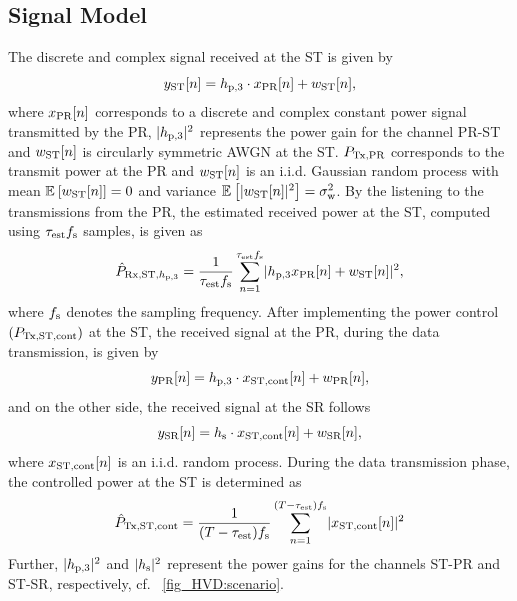 \subsection{Signal Model}
The discrete and complex signal received at the ST is given by
\begin{equation}
y_{\text{ST}}[n] = h_{\text{p,3}} \cdot x_{\text{PR}}[n] + w_{\text{ST}}[n],
\label{eq_HVD:sys_mod_st}
\end{equation}
where $x_{\text{PR}}[n]$ corresponds to a discrete and complex constant power signal transmitted by the PR, $|h_{\text{p,3}}|^2$ represents the power gain for the channel PR-ST and $w_{\text{ST}}[n]$ is circularly symmetric AWGN at the ST.
 $P_{\text{Tx,PR}}$  corresponds to the transmit power at the PR and $w_{\text{ST}}[n]$ is an i.i.d. Gaussian random process with mean ${\mathbb E}_{}\left[ w_{\text{ST}}[n] \right] = 0$ and variance ${\mathbb E}_{}\left[ |w_{\text{ST}}[n]|^2 \right] = \sigma^2_{\text{w}}$. By the listening to the transmissions from the PR, the estimated received power at the ST, computed using $\tau_{\text{est}} f_{\text{s}}$ samples, is given as
\begin{align}
\hat{P}_{\text{Rx,ST,$h_{\text{p,3}}$}} = {\frac{1}{{\tau_{\text{est}} f_{\text{s}}}}\sum_{n=1}^{\tau_{\text{est}} f_{\text{s}}}} { |h_{\text{p,3}} x_{\text{PR}}[n] + w_{\text{ST}}[n]|^2},
\label{eq_HVD:prcvd} 
\end{align}
where $f_{\text{s}}$ denotes the sampling frequency. After implementing the power control $(P_{\text{Tx,ST,cont}})$ at the ST, the received signal at the PR, during the data transmission, is given by
\begin{equation}
y_{\text{PR}}[n] = h_{\text{p,3}} \cdot x_{\text{ST,cont}}[n] + w_{\text{PR}}[n],
\label{eq_HVD:sys_mod_pr}
\end{equation}
and on the other side, the received signal at the SR follows
\begin{equation}
y_{\text{SR}}[n] = h_{\text{s}} \cdot x_{\text{ST,cont}}[n] + w_{\text{SR}}[n],
\label{eq_HVD:sys_mod_sr}
\end{equation}
where $x_{\text{ST,cont}}[n]$ is an i.i.d. random process. During the data transmission phase, the controlled power at the ST is determined as 
\begin{align}
\hat{P}_{\text{Tx,ST,cont}} = {\frac{1}{{(T - \tau_{\text{est}}) f_{\text{s}}}}\sum_{n=1}^{(T - \tau_{\text{est}}) f_{\text{s}}}} {|x_{\text{ST,cont}}[n]|^2} 
\label{eq_HVD:preg} 
\end{align}
Further, $|h_{\text{p,3}}|^2$ and $|h_{\text{s}}|^2$ represent the power gains for the channels ST-PR and ST-SR, respectively, cf. \figurename~\ref{fig_HVD:scenario}. 

